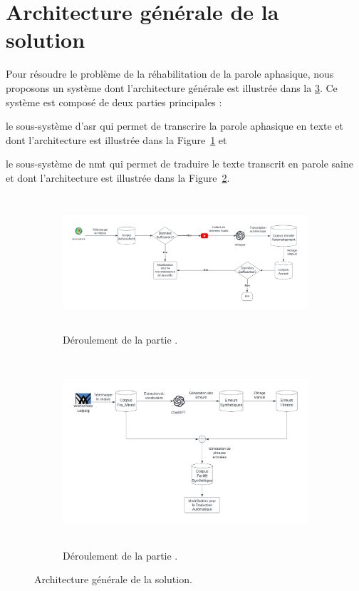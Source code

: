 \section{Architecture générale de la solution}

Pour résoudre le problème de la réhabilitation de la parole aphasique,
nous proposons un système dont l'architecture générale est illustrée dans la \cref{fig.archi}.
Ce système est composé de deux parties principales :
\begin{enumerate*}[label=(\alph*)]
    \item le sous-système d'\gls{asr} qui permet de transcrire la parole aphasique en texte
    et dont l'architecture est illustrée dans la Figure~\ref{fig.asr-archi} et
    \item le sous-système de \gls{nmt} qui permet de traduire le texte transcrit en parole saine
    et dont l'architecture est illustrée dans la Figure~\ref{fig.nmt-archi}.
\end{enumerate*}

\begin{figure}[hbt]
    \begin{subfigure}{\textwidth}
        \begin{center}
            \includegraphics[height=5cm]{assets/pdf/ASR.pdf}
        \end{center}
        \caption{Déroulement de la partie .}
        \label{fig.asr-archi}
    \end{subfigure}
    \begin{subfigure}{\textwidth}
        \begin{center}
            \includegraphics[height=7cm]{assets/pdf/NMT.pdf}
        \end{center}
        \caption{Déroulement de la partie .}
        \label{fig.nmt-archi}
    \end{subfigure}
    \caption{Architecture générale de la solution.}
    \label{fig.archi} 
\end{figure}

